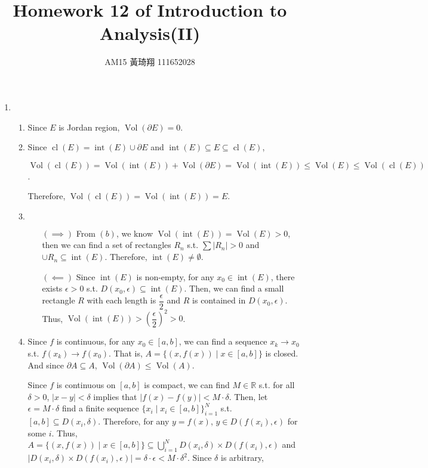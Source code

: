 \documentclass[12pt]{article}
\title{Homework 12 of Introduction to Analysis(II)}
\author{AM15 黃琦翔 111652028}
\DeclareMathOperator{\volumn}{Vol}
\DeclareMathOperator{\interior}{int}
\DeclareMathOperator{\closure}{cl}
\begin{document}
\maketitle
\begin{enumerate}
    \item \begin{enumerate}
        \item Since $E$ is Jordan region, $\volumn(\partial E) = 0$.

        \item Since $\closure(E) = \interior(E) \cup \partial E$ and $\interior(E)\subseteq E \subseteq \closure(E)$,

        $\volumn(\closure(E)) = \volumn(\interior(E)) + \volumn(\partial E) = \volumn(\interior(E))\leq \volumn(E) \leq \volumn(\closure(E))$.

        Therefore, $\volumn(\closure(E)) = \volumn(\interior(E)) = E$.

        \item $\ $
        \begin{enumerate}
            \item[$(\implies)$] From $(b)$, we know $\volumn(\interior(E)) = \volumn(E) > 0$, 
            then we can find a set of rectangles $R_n$ s.t. $\sum |R_n| > 0$ and $\cup R_n \subseteq \interior(E)$.
            Therefore, $\interior(E) \neq \emptyset$.

            \item[$(\impliedby)$] Since $\interior(E)$ is non-empty, for any $x_0\in \interior(E)$, there exists $\epsilon > 0$ s.t. $D(x_0, \epsilon) \subseteq \interior(E)$.
            Then, we can find a small rectangle $R$ with each length is $\dfrac{\epsilon}{2}$ and $R$ is contained in $D(x_0, \epsilon)$.
            Thus, $\volumn(\interior(E)) > \left(\dfrac{\epsilon}{2}\right)^2 > 0$.
        \end{enumerate}

        \item Since $f$ is continuous, for any $x_0 \in [a, b]$, we can find a sequence $x_k \to x_0$ s.t. $f(x_k) \to f(x_0)$.
        That is, $A = \{(x, f(x)) \mid x\in [a, b]\}$ is closed.
        And since $\partial A \subseteq A$, $\volumn(\partial A) \leq \volumn(A)$.
        
        Since $f$ is continuous on $[a, b]$ is compact, we can find $M \in \mathbb{R}$ s.t.
        for all $\delta > 0$, $|x - y| < \delta$ implies that $|f(x) - f(y)| < M \cdot \delta$.
        Then, let $\epsilon = M \cdot \delta$ find a finite sequence $\{x_i \mid x_i \in [a, b]\}_{i=1}^N$ s.t. $[a, b] \subseteq D(x_i, \delta)$.
        Therefore, for any $y = f(x)$, $y \in D(f(x_i), \epsilon)$ for some $i$.
        Thus, $A = \{(x, f(x)) \mid x\in [a, b]\} \subseteq \displaystyle\bigcup_{i=1}^N D(x_i, \delta)\times D(f(x_i), \epsilon)$ and $|D(x_i, \delta) \times D(f(x_i), \epsilon)| = \delta \cdot \epsilon < M\cdot \delta^2$.
        Since $\delta$ is arbitrary, 
    \end{enumerate}
\end{enumerate}
\end{document}
